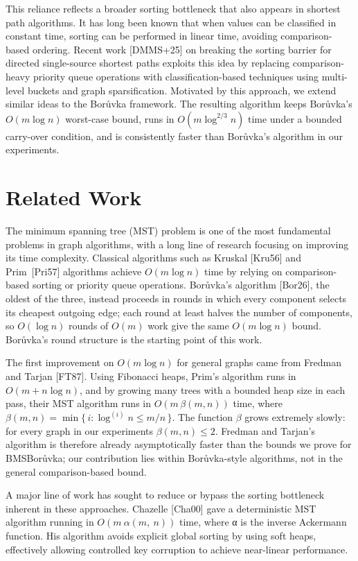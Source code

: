 \documentclass[11pt]{article}
\theoremstyle{plain}
\theoremstyle{remark}
\begin{document}
This reliance reflects a broader sorting bottleneck that also appears in
shortest path algorithms. It has long been known that when values can be
classified in constant time, sorting can be performed in linear time,
avoiding comparison-based ordering. Recent work {[}DMMS+25{]} on
breaking the sorting barrier for directed single-source shortest paths
exploits this idea by replacing comparison-heavy priority queue
operations with classification-based techniques using multi-level
buckets and graph sparsification. Motivated by this approach, we extend
similar ideas to the Borůvka framework. The resulting algorithm keeps
Borůvka's \(O(m \log n)\) worst-case bound, runs in
\(O(m \log^{2/3} n)\) time under a bounded carry-over condition, and is
consistently faster than Borůvka's algorithm in our experiments.

\section{Related Work}

The minimum spanning tree (MST) problem is one of the most fundamental
problems in graph algorithms, with a long line of research focusing on
improving its time complexity. Classical algorithms such as Kruskal
{[}Kru56{]} and Prim~{[}Pri57{]} algorithms achieve \(O(m \log n)\)
time by relying on comparison-based sorting or priority queue
operations. Borůvka's algorithm {[}Bor26{]}, the oldest of the three,
instead proceeds in rounds in which every component selects its
cheapest outgoing edge; each round at least halves the number of
components, so \(O(\log n)\) rounds of \(O(m)\) work give the same
\(O(m \log n)\) bound. Borůvka's round structure is the starting point
of this work.

The first improvement on \(O(m \log n)\) for general graphs came from
Fredman and Tarjan {[}FT87{]}. Using Fibonacci heaps, Prim's algorithm
runs in \(O(m + n \log n)\), and by growing many trees with a bounded
heap size in each pass, their MST algorithm runs in
\(O(m\,\beta(m,n))\) time, where
\(\beta(m,n) = \min\{\, i : \log^{(i)} n \le m/n \,\}\). The function
\(\beta\) grows extremely slowly: for every graph in our experiments
\(\beta(m,n) \le 2\). Fredman and Tarjan's algorithm is therefore
already asymptotically faster than the bounds we prove for BMSBorůvka;
our contribution lies within Borůvka-style algorithms, not in the
general comparison-based bound.

A major line of work has sought to reduce or bypass the sorting
bottleneck inherent in these approaches. Chazelle {[}Cha00{]} gave a
deterministic MST algorithm running in \(O(m\ \alpha(m,\ n))\) time,
where α is the inverse Ackermann function. His algorithm avoids explicit
global sorting by using soft heaps, effectively allowing controlled key
corruption to achieve near-linear performance.
\end{document}
